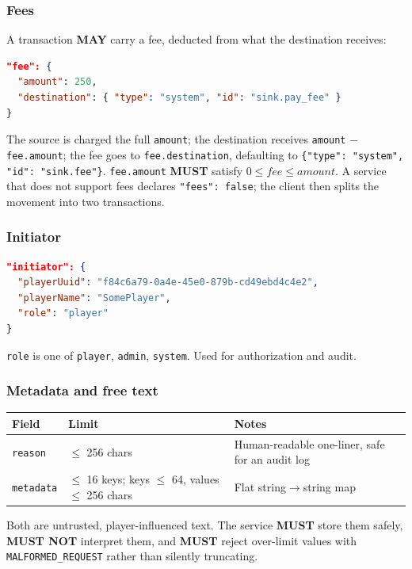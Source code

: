 \documentclass[11pt,a4paper]{article}
\newcommand{\code}[1]{\texttt{\small #1}}
\newcommand{\req}{\textbf{MUST}}
\newcommand{\opt}{\textbf{MAY}}
\begin{document}
\subsubsection*{Fees}

A transaction \opt{} carry a fee, deducted from what the destination receives:

\begin{lstlisting}[language=json]
"fee": {
  "amount": 250,
  "destination": { "type": "system", "id": "sink.pay_fee" }
}
\end{lstlisting}

The source is charged the full \code{amount}; the destination receives \code{amount} $-$
\code{fee.amount}; the fee goes to \code{fee.destination}, defaulting to
\code{\{"type": "system", "id": "sink.fee"\}}. \code{fee.amount} \req{} satisfy
$0 \leq \mathit{fee} \leq \mathit{amount}$. A service that does not support fees declares
\code{"fees": false}; the client then splits the movement into two transactions.

\subsubsection*{Initiator}

\begin{lstlisting}[language=json]
"initiator": {
  "playerUuid": "f84c6a79-0a4e-45e0-879b-cd49ebd4c4e2",
  "playerName": "SomePlayer",
  "role": "player"
}
\end{lstlisting}

\code{role} is one of \code{player}, \code{admin}, \code{system}. Used for authorization and audit.

\subsubsection*{Metadata and free text}

\begin{tabularx}{\linewidth}{L{2.4cm} L{6.0cm} X}
\toprule
\textbf{Field} & \textbf{Limit} & \textbf{Notes}\\
\midrule
\code{reason}   & $\leq$ 256 chars & Human-readable one-liner, safe for an audit log\\
\code{metadata} & $\leq$ 16 keys; keys $\leq$ 64, values $\leq$ 256 chars & Flat string$\to$string map\\
\bottomrule
\end{tabularx}

Both are untrusted, player-influenced text. The service \req{} store them safely, \textbf{MUST NOT}
interpret them, and \req{} reject over-limit values with \code{MALFORMED\_REQUEST} rather than
silently truncating.
\end{document}
